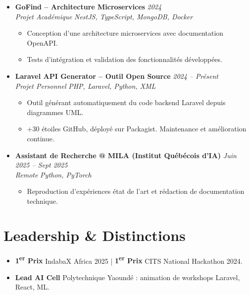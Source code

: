 \documentclass[a4paper,11pt]{article}
\begin{document}
\begin{itemize}[leftmargin=*, label={-}]
\item \textbf{GoFind -- Architecture Microservices} \hfill \textit{2024} \\
\textit{Projet Académique} \hfill \textit{NestJS, TypeScript, MongoDB, Docker}
\vspace{-2pt}
    \begin{itemize}[leftmargin=0.4cm, nosep, label=\tiny$\bullet$]
        \item \small{Conception d'une architecture microservices avec documentation OpenAPI.}
        \item \small{Tests d'intégration et validation des fonctionnalités développées.}
    \end{itemize}
\vspace{3pt}

\item \textbf{Laravel API Generator -- Outil Open Source} \hfill \textit{2024 -- Présent} \\
\textit{Projet Personnel} \hfill \textit{PHP, Laravel, Python, XML}
\vspace{-2pt}
    \begin{itemize}[leftmargin=0.4cm, nosep, label=\tiny$\bullet$]
        \item \small{Outil générant automatiquement du code backend Laravel depuis diagrammes UML.}
        \item \small{+30 étoiles GitHub, déployé sur Packagist. Maintenance et amélioration continue.}
    \end{itemize}
\vspace{3pt}

\item \textbf{Assistant de Recherche @ MILA (Institut Québécois d'IA)} \hfill \textit{Juin 2025 -- Sept 2025} \\
\textit{Remote} \hfill \textit{Python, PyTorch}
\vspace{-2pt}
    \begin{itemize}[leftmargin=0.4cm, nosep, label=\tiny$\bullet$]
        \item \small{Reproduction d'expériences état de l'art et rédaction de documentation technique.}
    \end{itemize}
\vspace{3pt}

\end{itemize}

\section{Leadership \& Distinctions}
\begin{itemize}[leftmargin=*, label=\tiny$\bullet$, nosep]
    \item \small{\textbf{1\textsuperscript{er} Prix} IndabaX Africa 2025 | \textbf{1\textsuperscript{er} Prix} CITS National Hackathon 2024.}
    \item \small{\textbf{Lead AI Cell} Polytechnique Yaoundé : animation de workshops Laravel, React, ML.}
\end{itemize}
\end{document}
